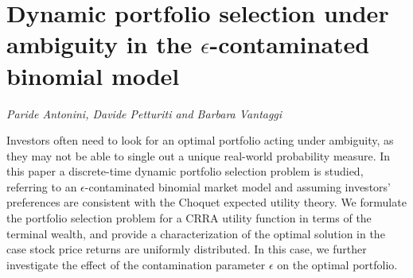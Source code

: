 \documentclass[../booklet.tex]{subfiles}
\begin{document}
\section[Dynamic portfolio selection under ambiguity in the $\epsilon$-contaminated binomial model. {\it Paride Antonini, Davide Petturiti and Barbara Vantaggi}]{Dynamic portfolio selection under ambiguity in the $\epsilon$-contaminated binomial model}
  

\begin{center}
  {\it Paride Antonini, Davide Petturiti and Barbara Vantaggi}
\end{center}

\vskip 0.8cm


Investors often need to look for an optimal portfolio acting under ambiguity, as they may not be able to single out a unique real-world probability measure. In this paper a discrete-time dynamic portfolio selection problem is studied, referring to an $\epsilon$-contaminated binomial market model and assuming investors' preferences
are consistent with the Choquet expected utility theory.  We formulate the portfolio selection problem for a CRRA utility function in terms of the terminal wealth, and provide a characterization of the optimal solution in the case stock price returns are uniformly distributed. In this case, we further
investigate the effect of the contamination parameter $\epsilon$ on the optimal portfolio.
\end{document}
